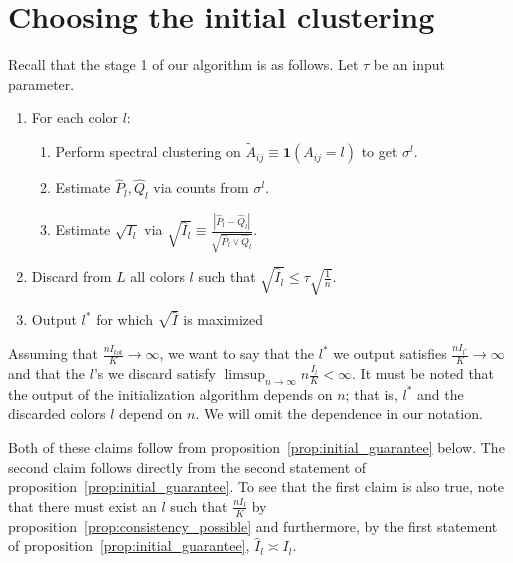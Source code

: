 \documentclass{article}
\begin{document}

\newpage
\section{Choosing the initial clustering}
\label{sec:initial_clustering}

Recall that the stage 1 of our algorithm is as follows. Let $\tau$ be an input parameter. 

\begin{enumerate}
\item For each color $l$:
  \begin{enumerate}
   \item Perform spectral clustering on $\tilde{A}_{ij} \equiv \mathbf{1}(A_{ij} = l)$ to get $\sigma^l$. 
   \item Estimate $\hat{P}_l, \hat{Q}_l$ via counts from $\sigma^l$. 
   \item Estimate $\sqrt{I_l}$ via 
  $\sqrt{ \hat{I}_l } \equiv \frac{| \hat{P}_l - \hat{Q}_l |}{\sqrt{ \hat{P}_l \vee \hat{Q}_l}}$. 
   \end{enumerate}
\item Discard from $L$ all colors $l$ such that $\sqrt{\hat{I}_l} \leq \tau \sqrt{ \frac{1}{n}}$.
\item Output $l^*$ for which $\sqrt{\hat{I}}$ is maximized
\end{enumerate}

Assuming that $ \frac{n I_{tot}}{K} \rightarrow \infty$, we want to say that the $l^*$ we output satisfies $\frac{n I_{l^*}}{K} \rightarrow \infty $ and that the $l$'s we discard satisfy $\limsup_{n \rightarrow \infty} n \frac{I_l}{K} < \infty$. It must be noted that the output of the initialization algorithm depends on $n$; that is, $l^*$ and the discarded colors $l$ depend on $n$. We will omit the dependence in our notation. 


Both of these claims follow from proposition~\ref{prop:initial_guarantee} below. The second claim follows directly from the second statement of proposition~\ref{prop:initial_guarantee}. To see that the first claim is also true, note that there must exist an $l$ such that $\frac{n I_l}{K}$ by proposition~\ref{prop:consistency_possible} and furthermore, by the first statement of proposition~\ref{prop:initial_guarantee}, $\hat{I}_{l} \asymp I_{l}$. 
\end{document}
